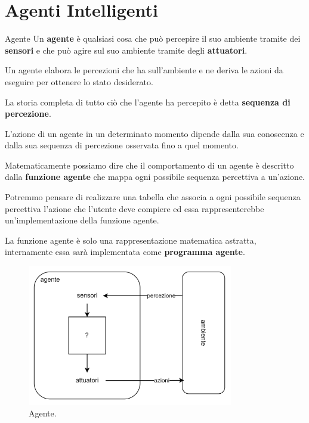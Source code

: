 \chapter{Agenti Intelligenti}

\begin{definition-box}{Agente}
Un \textbf{agente} è qualsiasi cosa che può percepire il suo ambiente
tramite dei \textbf{sensori} e che può agire sul suo ambiente
tramite degli \textbf{attuatori}.
\end{definition-box}

Un agente elabora le percezioni che ha sull'ambiente e ne deriva le azioni da
eseguire per ottenere lo stato desiderato.

La storia completa di tutto ciò che l'agente ha percepito è detta
\textbf{sequenza di percezione}.

L'azione di un agente in un determinato momento dipende dalla sua conoscenza e
dalla sua sequenza di percezione osservata fino a quel momento.

Matematicamente possiamo dire che il comportamento di un agente è descritto
dalla \textbf{funzione agente} che mappa ogni possibile sequenza percettiva a
un'azione.

Potremmo pensare di realizzare una tabella che associa a ogni possibile
sequenza percettiva l'azione che l'utente deve compiere ed essa rappresenterebbe
un'implementazione della funzione agente.

La funzione agente è solo una rappresentazione matematica astratta,
internamente essa sarà implementata come \textbf{programma agente}.

\begin{figure}[H]
	\centering
	\includegraphics[width=0.8\textwidth]{capitoli/agenti-intelligenti/imgs/agente.png}
	\caption{Agente.}
\end{figure}

